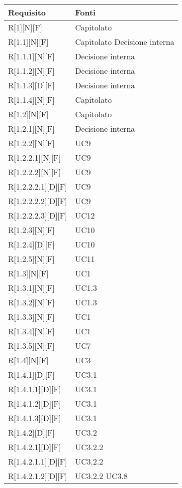 
\begin{longtable}{X | X}  
			\rowcolor{orange!85}Requisito & Fonti \\
\endhead
R[1][N][F] & Capitolato \\
\hline
R[1.1][N][F] & Capitolato \newline Decisione interna \\
\hline
R[1.1.1][N][F] & Decisione interna \\
\hline
R[1.1.2][N][F] & Decisione interna \\
\hline
R[1.1.3][D][F] & Decisione interna \\
\hline
R[1.1.4][N][F] & Capitolato \\
\hline
R[1.2][N][F] & Capitolato \\
\hline
R[1.2.1][N][F] & Decisione interna \\
\hline
R[1.2.2][N][F] & UC9 \\
\hline
R[1.2.2.1][N][F] & UC9 \\
\hline
R[1.2.2.2][N][F] & UC9 \\
\hline
R[1.2.2.2.1][D][F] & UC9 \\
\hline
R[1.2.2.2.2][D][F] & UC9 \\
\hline
R[1.2.2.2.3][D][F] & UC12 \\
\hline
R[1.2.3][N][F] & UC10 \\
\hline
R[1.2.4][D][F] & UC10 \\
\hline
R[1.2.5][N][F] & UC11 \\
\hline
R[1.3][N][F] & UC1 \\
\hline
R[1.3.1][N][F] & UC1.3 \\
\hline
R[1.3.2][N][F] & UC1.3 \\
\hline
R[1.3.3][N][F] & UC1 \\
\hline
R[1.3.4][N][F] & UC1 \\
\hline
R[1.3.5][N][F] & UC7 \\
\hline
R[1.4][N][F] & UC3 \\
\hline
R[1.4.1][D][F] & UC3.1 \\
\hline
R[1.4.1.1][D][F] & UC3.1 \\
\hline
R[1.4.1.2][D][F] & UC3.1 \\
\hline
R[1.4.1.3][D][F] & UC3.1 \\
\hline
R[1.4.2][D][F] & UC3.2 \\
\hline
R[1.4.2.1][D][F] & UC3.2.2 \\
\hline
R[1.4.2.1.1][D][F] & UC3.2.2 \\
\hline
R[1.4.2.1.2][D][F] & UC3.2.2 \newline UC3.8 \\

\end{longtable}
